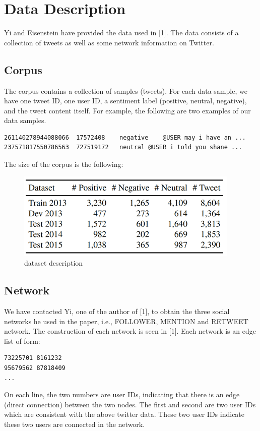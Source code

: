 
\section{Data Description}
\label{Sec:ProblemData}

Yi and Eisenstein have provided the data used in [1].
The data consists of a collection of tweets as well as some network information on Twitter.

\subsection{Corpus}
The corpus contains a collection of samples (tweets). 
For each data sample, we have one tweet ID, one user ID, a sentiment label (positive, neutral, negative), and the tweet content itself. For example, the following are two examples of our data samples.
\begin{verbatim}
261140278944088066	17572408	negative	@USER may i have an ...
237571817550786563	727519172	neutral	@USER i told you shane ...
\end{verbatim}

The size of the corpus is the following:
\begin{figure}[hbt]
\centering
  \includegraphics{Picture1.png}
  \caption{dataset description}
\end{figure}


\subsection{Network}
We have contacted Yi, one of the author of [1], to obtain the three social networks he used in the paper,
i.e.,
FOLLOWER, MENTION and RETWEET network. The construction of each network is seen in [1].
Each network is an edge list of form:
\begin{verbatim}
73225701 8161232
95679562 87818409
...
\end{verbatim}
On each line, the two numbers are user IDs, indicating that there is an edge (direct connection) between the two nodes.
The first and second are two user IDs which are consistent with the above twitter data. These two user IDs indicate these two users are connected in the network. 

